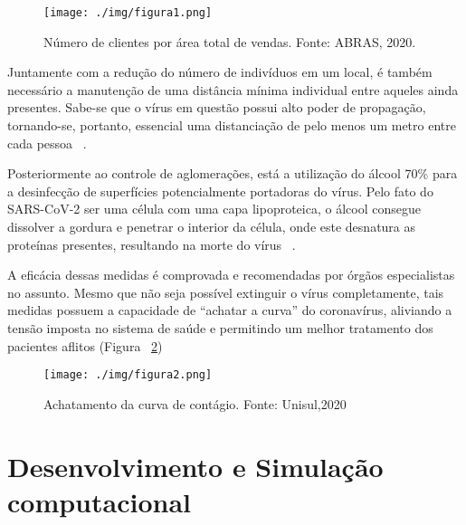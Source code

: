 \documentclass[10pt,twocolumn,letterpaper]{article}
\begin{document}
{
\begin{figure}[!h]
\begin{center}
   \texttt{[image: ./img/figura1.png]}
\end{center}
   \caption{Número de clientes por área total de vendas. \newline \centering Fonte: ABRAS, 2020.}
\label{fig:figura1}
\end{figure}
}

Juntamente com a redução do número de indivíduos em um local, é também necessário a manutenção de uma distância mínima individual entre aqueles ainda presentes. Sabe-se que o vírus em questão possui alto poder de propagação, tornando-se, portanto, essencial uma distanciação de pelo menos um metro entre cada pessoa ~\cite{7}.

Posteriormente ao controle de aglomerações, está a utilização do álcool 70\% para a desinfecção de superfícies potencialmente portadoras do vírus. Pelo fato do SARS-CoV-2 ser uma célula com uma capa lipoproteica, o álcool consegue dissolver a gordura e penetrar o interior da célula, onde este desnatura as proteínas  presentes, resultando na morte do vírus ~\cite{8}.

A eficácia dessas medidas é comprovada e recomendadas por órgãos especialistas no assunto. Mesmo que não seja possível extinguir o vírus completamente, tais medidas possuem a capacidade de “achatar a curva” do coronavírus, aliviando a tensão imposta no sistema de saúde e permitindo um melhor tratamento dos pacientes aflitos (Figura ~\ref{fig:figura2})

{
\begin{figure}[!h]
\begin{center}
   \texttt{[image: ./img/figura2.png]}
\end{center}
   \caption{Achatamento da curva de contágio. \newline \centering Fonte: Unisul,2020}
\label{fig:figura2}
\end{figure}
}

\section{Desenvolvimento e Simulação computacional}
\end{document}
